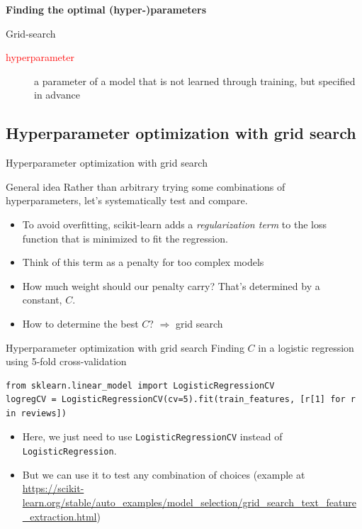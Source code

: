 \documentclass{beamer}
\begin{document}
\begin{frame}[plain]
\vspace{2cm}
\textbf{Finding the optimal (hyper-)parameters}

Grid-search
\vspace{2cm}

{\footnotesize 
\begin{description}
\item[\textcolor{red}{hyperparameter}] a parameter of a model that is not learned through training, but specified in advance
\end{description}
}
\end{frame}



\subsection{Hyperparameter optimization with grid search}

\begin{frame}{Hyperparameter optimization with grid search}
\begin{block}{General idea}
Rather than arbitrary trying some combinations of hyperparameters, let's systematically test and compare.
\end{block}

\pause

\begin{example}
\begin{itemize}[<+->]
\item To avoid overfitting, scikit-learn adds a \emph{regularization term} to the loss function that is minimized to fit the regression.
\item Think of this term as a penalty for too complex models
\item How much weight should our penalty carry? That's determined by a constant, $C$.
\item How to determine the best $C$? $\Rightarrow$ grid search 
\end{itemize}
\end{example}
\end{frame}


\begin{frame}[fragile]{Hyperparameter optimization with grid search}
Finding $C$ in a logistic regression using 5-fold cross-validation
\begin{lstlisting}
from sklearn.linear_model import LogisticRegressionCV
logregCV = LogisticRegressionCV(cv=5).fit(train_features, [r[1] for r in reviews])
\end{lstlisting}
\pause 

\begin{itemize}[<+->]
\item Here, we just need to use \texttt{LogisticRegressionCV} instead of \texttt{LogisticRegression}. 
\item But we can use it to test any combination of choices (example at \url{https://scikit-learn.org/stable/auto\_examples/model\_selection/grid\_search_text\_feature\_extraction.html})
\end{itemize}

\end{frame}
\end{document}
